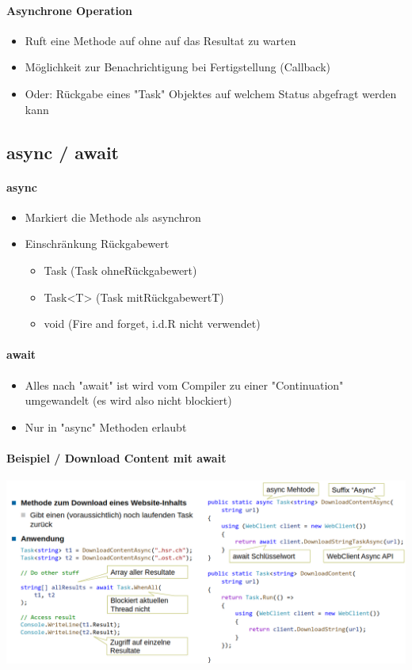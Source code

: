\documentclass[
a4paper,
oneside,
10pt,
fleqn,
headsepline,
toc=listofnumbered, 
bibliography=totocnumbered]{scrartcl}
\begin{document}
\paragraph{Asynchrone Operation}
\begin{itemize}
	\item Ruft eine Methode auf ohne auf das Resultat zu warten
	\item Möglichkeit zur Benachrichtigung bei Fertigstellung (Callback)
	\item Oder: Rückgabe eines "Task" Objektes auf welchem Status abgefragt werden kann
\end{itemize}
\subsection{async / await}
\paragraph{async}
\begin{itemize}
	\item Markiert die Methode als asynchron
	\item Einschränkung Rückgabewert
	      \begin{itemize}
		      \item Task (Task ohneRückgabewert)
		      \item Task<T> (Task mitRückgabewertT)
		      \item void (Fire and forget, i.d.R nicht verwendet)
	      \end{itemize}
\end{itemize}
\paragraph{await}
\begin{itemize}
	\item Alles nach "await" ist wird vom Compiler zu einer "Continuation" umgewandelt (es wird also nicht blockiert)
	\item Nur in "async" Methoden erlaubt
\end{itemize}
\clearpage
\paragraph{Beispiel / Download Content mit await} \hfill
\newline


\begin{minipage}[t]{0.95\textwidth}
	\centering
	\includegraphics[width=0.95\linewidth]{images/beispiel-async-await.png}
\end{minipage}
\end{document}
